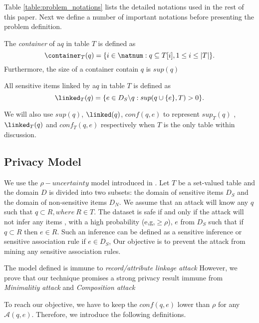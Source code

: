 Table \ref{table:problem_notations} lists the detailed notations used in the
rest of this paper. Next we define a number of important notations before
presenting the problem definition.


\begin{definition}[Container]
The \emph{container} of a\qid $q$ in table $T$ is defined as \[
\container_T(q) = \{ i \in \natnum : q \subseteq T[i], 1 \leq i \leq |T| \}
.\] Furthermore, the size of a container contain $q$ is  $sup(q)$
\end{definition}


\begin{definition}
All sensitive items linked by a\qid $q$ in table $T$ is defined as \[ \linked_T(q) = \{ e \in D_S \backslash q : sup(q\cup\{e\},T) > 0 \} .\]
\end{definition}


We will also use $sup(q)$, $\linked(q)$, $conf(q,e)$ to represent
$sup_{T}(q)$ , $\linked_T(q)$ and $conf_{T}(q,e)$ respectively when $T$ is the only table within discussion.



\subsection{Privacy Model}
We use the $\rho-uncertainty$ model introduced in \cite{Cao:2010:rho}. Let $T$ be
a set-valued table and the domain $D$ is divided into two subsets: the domain  of sensitive items
$D_S$ and the domain of non-sensitive items $D_N$. We assume that an attack will know any
\qids $q$ such that $q\subset R, where~ R \in T$. The dataset is safe if and only if
the attack will not infer  any items , with a high probability (e,g,$\geq \rho$),
 $e$ from $D_S$ such that
if $q \subset R$ then $e\in R$. Such an inference can be defined
as a sensitive inference or sensitive association rule if $e \in D_S$,
 Our objective is to
prevent the attack from mining any sensitive association rules.

The model defined is immune to
{\em
record/attribute linkage attack} \cite{FungWCY10:Survey}
However, we  prove that our technique promises a strong privacy result immune from  {\em Minimalitiy
attack} \cite{Wong:2007:Minimality} and {\em Composition attack}
\cite{Ganta:2008:Composition}

To reach our objective, we have to keep the $conf(q,e)$ lower than $\rho$
for any $\mathcal{A}(q,e)$. Therefore, we introduce the following definitions.

